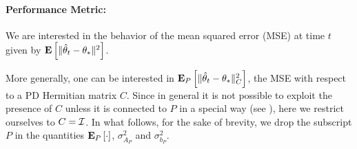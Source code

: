 \paragraph{Performance Metric:}  
We are interested in the behavior of the mean squared error (MSE) at time $t$ given by $\mathbf{E}\left[\| \hat{\theta}_t-\theta_*\|^2\right]$. {More generally, one can be interested in $\mathbf{E}_P\left[\| \hat{\theta}_t-\theta_*\|_C^2\right]$, the MSE with respect to a PD Hermitian matrix $C$. Since in general it is not possible to exploit the presence of $C$ unless it is connected to $P$ in a special way (see ),
here we restrict ourselves to $C = \mathcal{I}$. In what follows, for the sake of brevity, we drop the subscript $P$ in the quantities $\mathbf{E}_P\left[\cdot\right]$, $\sigma^2_{A_P}$ and $\sigma^2_{b_P}$.
\begin{comment}
\footnote{We note here that $\E[\normsm{\thh_t-\ts}_C^2]$, which measures the MSE in the quadratic norm with respect to a positive definite matrix $C\succ 0$. However, unless $C$ has some special structure, it is not possible to exploit this generality in our bounds. Further, when data is bounded $\norm{C}^2$ is also bounded and it is straightforward to see that $\EEP{\norm{\thh_t-\ts}}^2_C\leq \norm{C}^2\EEP{\norm{\thh_t-\ts}^2}$. So, for the purpose of stating our results we will not use the general quadratic norm, however, will use it when we discuss the work by \cite{bach} in LSE, where its usage is relevant.}
\end{comment}

}
